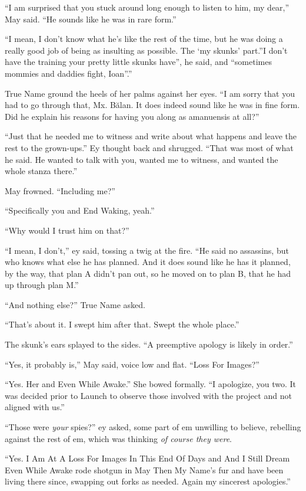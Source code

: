 ``I am surprised that you stuck around long enough to listen to him, my dear,'' May said. ``He sounds like he was in rare form.''

``I mean, I don't know what he's like the rest of the time, but he was doing a really good job of being as insulting as possible. The `my skunks' part.''I don't have the training your pretty little skunks have'', he said, and ``sometimes mommies and daddies fight, Ioan''.''

True Name ground the heels of her palms against her eyes. ``I am sorry that you had to go through that, Mx. Bălan. It does indeed sound like he was in fine form. Did he explain his reasons for having you along as amanuensis at all?''

``Just that he needed me to witness and write about what happens and leave the rest to the grown-ups.'' Ey thought back and shrugged. ``That was most of what he said. He wanted to talk with you, wanted me to witness, and wanted the whole stanza there.''

May frowned. ``Including me?''

``Specifically you and End Waking, yeah.''

``Why would I trust him on that?''

``I mean, I don't,'' ey said, tossing a twig at the fire. ``He said no assassins, but who knows what else he has planned. And it does sound like he has it planned, by the way, that plan A didn't pan out, so he moved on to plan B, that he had up through plan M.''

``And nothing else?'' True Name asked.

``That's about it. I swept him after that. Swept the whole place.''

The skunk's ears splayed to the sides. ``A preemptive apology is likely in order.''

``Yes, it probably is,'' May said, voice low and flat. ``Loss For Images?''

``Yes. Her and Even While Awake.'' She bowed formally. ``I apologize, you two. It was decided prior to Launch to observe those involved with the project and not aligned with us.''

``Those were \emph{your} spies?'' ey asked, some part of em unwilling to believe, rebelling against the rest of em, which was thinking \emph{of course they were}.

``Yes. I Am At A Loss For Images In This End Of Days and And I Still Dream Even While Awake rode shotgun in May Then My Name's fur and have been living there since, swapping out forks as needed. Again my sincerest apologies.''

